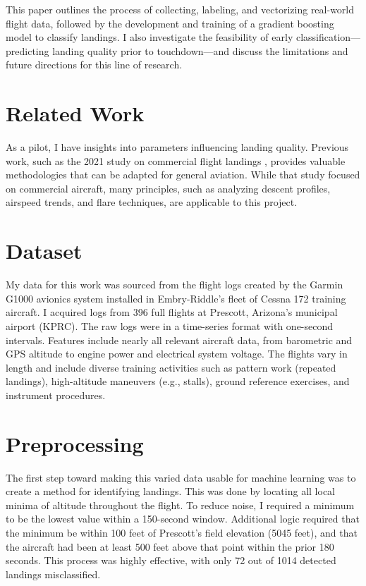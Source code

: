 \documentclass[conference]{IEEEtran}
\begin{document}
This paper outlines the process of collecting, labeling, and vectorizing real-world flight data, followed by the development and training of a gradient boosting model to classify landings. I also investigate the feasibility of early classification—predicting landing quality prior to touchdown—and discuss the limitations and future directions for this line of research.

\section{Related Work}
As a pilot, I have insights into parameters influencing landing quality. Previous work, such as the 2021 study on commercial flight landings \cite{gil2022epilots}, provides valuable methodologies that can be adapted for general aviation. While that study focused on commercial aircraft, many principles, such as analyzing descent profiles, airspeed trends, and flare techniques, are applicable to this project.

\section{Dataset}
My data for this work was sourced from the flight logs created by the Garmin G1000 avionics system installed in Embry-Riddle's fleet of Cessna 172 training aircraft. I acquired logs from 396 full flights at Prescott, Arizona's municipal airport (KPRC). The raw logs were in a time-series format with one-second intervals. Features include nearly all relevant aircraft data, from barometric and GPS altitude to engine power and electrical system voltage. The flights vary in length and include diverse training activities such as pattern work (repeated landings), high-altitude maneuvers (e.g., stalls), ground reference exercises, and instrument procedures.

\section{Preprocessing}
The first step toward making this varied data usable for machine learning was to create a method for identifying landings. This was done by locating all local minima of altitude throughout the flight. To reduce noise, I required a minimum to be the lowest value within a 150-second window. Additional logic required that the minimum be within 100 feet of Prescott’s field elevation (5045 feet), and that the aircraft had been at least 500 feet above that point within the prior 180 seconds. This process was highly effective, with only 72 out of 1014 detected landings misclassified.
\end{document}
